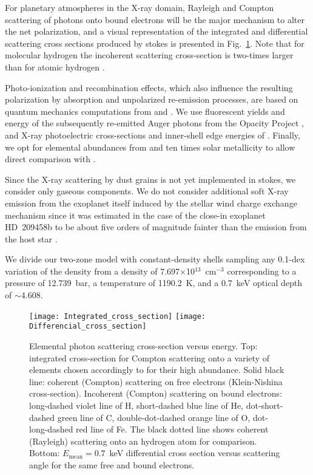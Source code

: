 \documentclass[iop]{emulateapj}
\begin{document}
For planetary atmospheres in the X-ray domain, Rayleigh and Compton scattering of photons onto bound electrons will be the major mechanism 
to alter the net polarization, and a visual representation of the integrated and differential scattering cross sections produced by {\sc stokes} 
is presented in Fig.~\ref{Fig:ElectronBound}. Note that for molecular hydrogen the incoherent scattering cross-section is two-times larger 
than for atomic hydrogen \citep{Sunyaev1999}.
 
Photo-ionization and recombination effects, which also influence the resulting polarization by absorption and unpolarized re-emission processes, 
are based on quantum mechanics computations from \citet{Lee1994a} and \citet{Lee1994b}. We use fluorescent yields and energy of the subsequently 
re-emitted Auger photons from the Opacity Project \citep{Cunto1992}, and X-ray photoelectric cross-sections and inner-shell edge energies of \cite{Verner1995}.
Finally, we opt for elemental abundances from \citet{Asplund2009} and ten times solar metallicity to allow direct comparison with \cite{Poppenhaeger2013}.

Since the X-ray scattering by dust grains \citep{Mathis1991} is not yet implemented in {\sc stokes}, we consider only gaseous components. 
We do not consider additional soft X-ray emission from the exoplanet itself induced by the stellar wind charge exchange mechanism 
since it was estimated in the case of the close-in exoplanet HD~209458b to be about five orders of magnitude fainter than the emission 
from the host star \citep{Kislyakova2015}.

We divide our two-zone model with constant-density shells sampling any 0.1-dex variation of the density from a density of 7.697$\times$10$^{13}$~cm$^{-3}$ 
corresponding to a pressure of 12.739~bar, a temperature of 1190.2~K, and a 0.7~keV optical depth of $\sim$4.608.

\begin{figure}
  \centering
  \texttt{[image: Integrated\_cross\_section]} 
  \texttt{[image: Differencial\_cross\_section]} 
  \caption{Elemental photon scattering cross-section versus energy.
	   Top: integrated cross-section for Compton scattering 
	   onto a variety of elements chosen accordingly to \citet{Asplund2009} 
	   for their high abundance. Solid black line: coherent (Compton) 
	   scattering on free electrons (Klein-Nishina cross-section).
	   Incoherent (Compton) scattering on bound electrons: long-dashed violet 
	   line of H, short-dashed blue line of He, dot-short-dashed green line of C, 
	   double-dot-dashed orange line of O, dot-long-dashed red line of Fe.
	   The black dotted line shows coherent (Rayleigh) scattering onto 
	   an hydrogen atom for comparison. Bottom: $E_\mathrm{mean}=0.7$~keV 
	   differential cross section versus scattering angle for the same 
	   free and bound electrons.}
  \label{Fig:ElectronBound} 
\end{figure}
\end{document}
